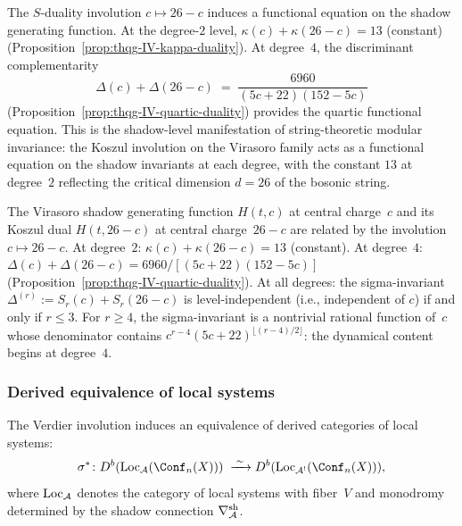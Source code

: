 \begin{remark}%
\label{rem:functional-equation-shadow-gf}%
%
The $S$-duality involution $c \mapsto 26 - c$ induces a functional
equation on the shadow generating function.
At the degree-$2$ level,
$\kappa(c) + \kappa(26-c) = 13$ (constant)
(Proposition~\ref{prop:thqg-IV-kappa-duality}).
At degree~$4$, the discriminant complementarity
\[
\Delta(c) + \Delta(26-c)
\;=\;
\frac{6960}{(5c+22)(152-5c)}
\]
(Proposition~\ref{prop:thqg-IV-quartic-duality})
provides the quartic functional equation.
This is the shadow-level manifestation of string-theoretic
modular invariance: the Koszul involution on the Virasoro family
acts as a functional equation on the shadow invariants at each
degree, with the constant $13$ at degree~$2$ reflecting the critical
dimension $d = 26$ of the bosonic string.
\end{remark}

\begin{remark}
\label{rem:koszul-duality-functional-equation}
The Virasoro shadow generating function $H(t,c)$ at central charge~$c$ and its Koszul dual $H(t, 26-c)$ at central charge~$26-c$ are related by the involution $c \mapsto 26-c$. At degree~$2$: $\kappa(c) + \kappa(26-c) = 13$ (constant). At degree~$4$: $\Delta(c) + \Delta(26-c) = 6960/[(5c+22)(152-5c)]$ (Proposition~\ref{prop:thqg-IV-quartic-duality}). At all degrees: the sigma-invariant $\Delta^{(r)} := S_r(c) + S_r(26-c)$ is level-independent (i.e., independent of $c$) if and only if $r \leq 3$. For $r \geq 4$, the sigma-invariant is a nontrivial rational function of~$c$ whose denominator contains $c^{r-4}(5c+22)^{\lfloor(r-4)/2\rfloor}$: the dynamical content begins at degree~$4$.
\end{remark}

\subsubsection{Derived equivalence of local systems}

\begin{theorem}
\label{thm:thqg-IV-local-system-duality}
The Verdier involution induces an equivalence of derived categories
of local systems:
\begin{equation}\label{eq:thqg-IV-loc-equivalence}
\sigma^*\colon
D^b(\Loc_{\cA}(\Conf_n(X)))
\;\xrightarrow{\;\sim\;}
D^b(\Loc_{\cA^!}(\Conf_n(X))),
\end{equation}
where $\operatorname{Loc}_{\mathcal{A}}$ denotes the category of local systems with
fiber~$V$ and monodromy determined by the shadow connection
$\nabla^{\mathrm{sh}}_{\mathcal{A}}$.
\end{theorem}

